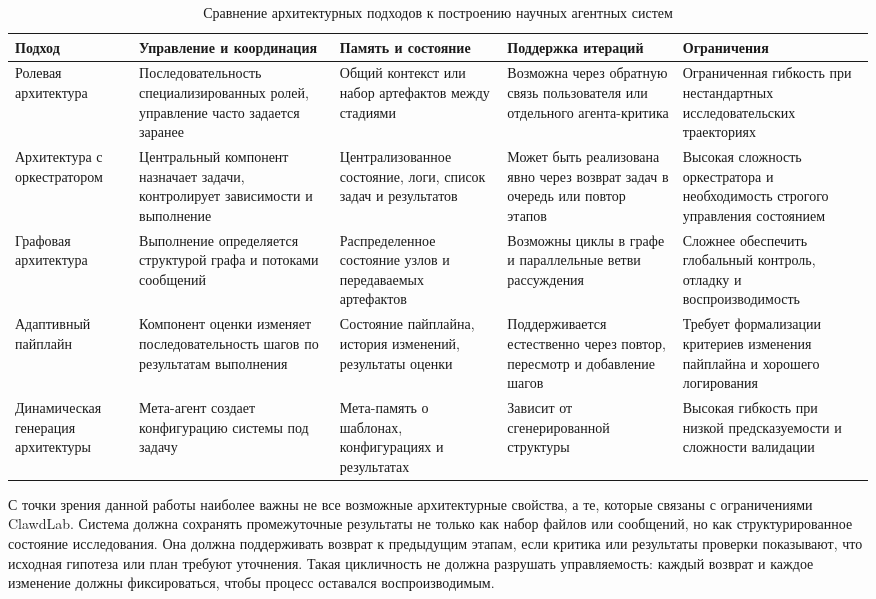 \begin{table}[h!]
\centering
\small
\caption{Сравнение архитектурных подходов к построению научных агентных систем}
\begin{tabular}{|p{3.0cm}|p{3.2cm}|p{3.2cm}|p{3.4cm}|p{3.2cm}|}
\hline
\textbf{Подход} & \textbf{Управление и координация} & \textbf{Память и состояние} & \textbf{Поддержка итераций} & \textbf{Ограничения} \\
\hline
Ролевая архитектура & Последовательность специализированных ролей, управление часто задается заранее & Общий контекст или набор артефактов между стадиями & Возможна через обратную связь пользователя или отдельного агента-критика & Ограниченная гибкость при нестандартных исследовательских траекториях \\
\hline
Архитектура с оркестратором & Центральный компонент назначает задачи, контролирует зависимости и выполнение & Централизованное состояние, логи, список задач и результатов & Может быть реализована явно через возврат задач в очередь или повтор этапов & Высокая сложность оркестратора и необходимость строгого управления состоянием \\
\hline
Графовая архитектура & Выполнение определяется структурой графа и потоками сообщений & Распределенное состояние узлов и передаваемых артефактов & Возможны циклы в графе и параллельные ветви рассуждения & Сложнее обеспечить глобальный контроль, отладку и воспроизводимость \\
\hline
Адаптивный пайплайн & Компонент оценки изменяет последовательность шагов по результатам выполнения & Состояние пайплайна, история изменений, результаты оценки & Поддерживается естественно через повтор, пересмотр и добавление шагов & Требует формализации критериев изменения пайплайна и хорошего логирования \\
\hline
Динамическая генерация архитектуры & Мета-агент создает конфигурацию системы под задачу & Мета-память о шаблонах, конфигурациях и результатах & Зависит от сгенерированной структуры & Высокая гибкость при низкой предсказуемости и сложности валидации \\
\hline
\end{tabular}
\end{table}

С точки зрения данной работы наиболее важны не все возможные архитектурные свойства, а те, которые связаны с ограничениями ClawdLab. Система должна сохранять промежуточные результаты не только как набор файлов или сообщений, но как структурированное состояние исследования. Она должна поддерживать возврат к предыдущим этапам, если критика или результаты проверки показывают, что исходная гипотеза или план требуют уточнения. Такая цикличность не должна разрушать управляемость: каждый возврат и каждое изменение должны фиксироваться, чтобы процесс оставался воспроизводимым.

